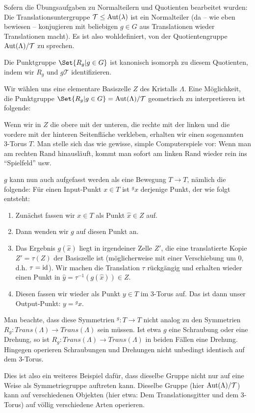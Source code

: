 \begin{remark}
Sofern die Übungsaufgaben zu Normalteilern und Quotienten bearbeitet wurden: Die Translationsuntergruppe $\mathcal{T}\leq\operatorname{Aut}(\lambda)$ ist ein Normalteiler (da -- wie eben bewiesen -- konjugieren mit beliebigen $g\in G$ aus Translationen wieder Translationen macht). Es ist also wohldefiniert, von der Quotientengruppe $\operatorname{Aut}(\Lambda) / \mathcal{T}$ zu sprechen.

Die Punktgruppe $\Set{R_g | g\in G}$ ist kanonisch isomorph zu diesem Quotienten, indem wir $R_g$ und $g\mathcal{T}$ identifizieren.
\end{remark}

\begin{remark}
Wir wählen uns eine elementare Basiszelle $Z$ des Kristalls $\Lambda$. Eine Möglichkeit, die Punktgruppe $\Set{R_g | g\in G}=\Aut(\Lambda)/\mathcal{T}$ geometrisch zu interpretieren ist folgende:

Wenn wir in $Z$ die obere mit der unteren, die rechte mit der linken und die vordere mit der hinteren Seitenfläche verkleben, erhalten wir einen sogenannten 3-Torus $T$. Man stelle sich das wie gewisse, simple Computerspiele vor: Wenn man am rechten Rand hinausläuft, kommt man sofort am linken Rand wieder rein ins \enquote{Spielfeld} usw.

\medbreak
$g$ kann nun auch aufgefasst werden als eine Bewegung $T\to T$, nämlich die folgende: Für einen Input-Punkt $x\in T$ ist ${^g x}$ derjenige Punkt, der wie folgt entsteht:
\begin{enumerate}
\item Zunächst fassen wir $x\in T$ als Punkt $\hat{x}\in Z$ auf.
\item Dann wenden wir $g$ auf diesen Punkt an.
\item Das Ergebnis $g(\hat{x})$ liegt in irgendeiner Zelle $Z'$, die eine translatierte Kopie $Z'=\tau(Z)$ der Basiszelle ist (möglicherweise mit einer Verschiebung um $0$, d.h. $\tau=\operatorname{id}$). Wir machen die Translation $\tau$ rückgängig und erhalten wieder einen Punkt in $\hat{y}=\tau^{-1}(g(\hat{x}))\in Z$.
\item Diesen fassen wir wieder als Punkt $y\in T$ im 3-Torus auf. Das ist dann unser Output-Punkt: $y={^g x}$.
\end{enumerate}

Man beachte, dass diese Symmetrien ${^g}: T\to T$ nicht analog zu den Symmetrien $R_g: Trans(\Lambda)\to Trans(\Lambda)$ sein müssen. Ist etwa $g$ eine Schraubung oder eine Drehung, so ist $R_g: Trans(\Lambda) \to Trans(\Lambda)$ in beiden Fällen eine Drehung. Hingegen operieren Schraubungen und Drehungen nicht unbedingt identisch auf dem 3-Torus.

Dies ist also ein weiteres Beispiel dafür, dass dieselbe Gruppe nicht nur auf eine Weise als Symmetriegruppe auftreten kann. Dieselbe Gruppe (hier $\operatorname{Aut}(\Lambda) /\mathcal{T}$) kann auf verschiedenen Objekten (hier etwa: Dem Translationsgitter und dem 3-Torus) auf völlig verschiedene Arten operieren.
\end{remark}


